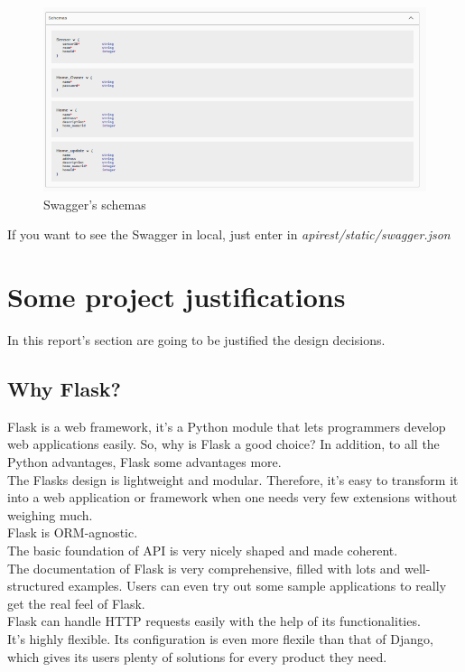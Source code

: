 \documentclass[a4paper,12pt]{article}
\begin{document}
\begin{figure}[H]
    \centering
    \includegraphics[scale = 0.5]{images/Swagger schemas.png}
    \caption{Swagger's schemas}
    \label{fig:my_label}
\end{figure}
If you want to see the Swagger in local, just enter in \textit{apirest/static/swagger.json}
\newpage
\section*{Some project justifications}
In this report's section are going to be justified the design decisions.
\subsection*{Why Flask?}
Flask is a web framework, it’s a Python module that lets programmers develop web applications easily.
So, why is Flask a good choice? In addition, to all the Python advantages, Flask some advantages more.\\
The Flasks design is lightweight and modular. Therefore, it's easy to transform it into a web application or framework when one needs very few extensions without weighing much.\\
Flask is ORM-agnostic.\\
The basic foundation of API is very nicely shaped and made coherent.\\
The documentation of Flask is very comprehensive, filled with lots and well-structured examples. Users can even try out some sample applications to really get the real feel of Flask.\\
Flask can handle HTTP requests easily with the help of its functionalities.\\
It's highly flexible. Its configuration is even more flexile than that of Django, which gives its users plenty of solutions for every product they need.
\end{document}
